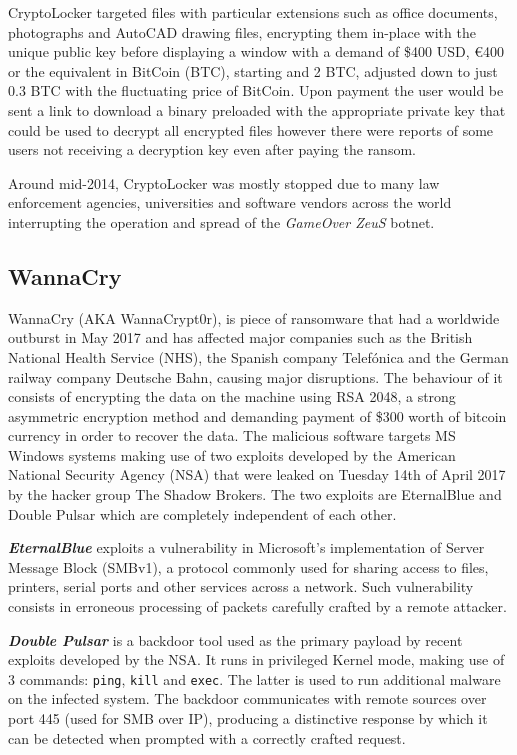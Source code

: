 \documentclass[10pt,a4paper]{article}
\begin{document}
CryptoLocker targeted files with particular extensions such as office documents, photographs and AutoCAD drawing files, encrypting them in-place with the unique public key before displaying a window with a demand of \$400 USD, \euro400 or the equivalent in BitCoin (BTC), starting and 2 BTC, adjusted down to just 0.3 BTC with the fluctuating price of BitCoin. Upon payment the user would be sent a link to download a binary preloaded with the appropriate private key that could be used to decrypt all encrypted files however there were reports of some users not receiving a decryption key even after paying the ransom.

Around mid-2014, CryptoLocker was mostly stopped due to many law enforcement agencies, universities and software vendors across the world interrupting the operation and spread of the \textit{GameOver ZeuS} botnet.

\subsection{WannaCry}
WannaCry (AKA WannaCrypt0r), is piece of ransomware that had a worldwide outburst in May 2017 and has affected major companies such as the British National Health Service (NHS), the Spanish company Telefónica and the German railway company Deutsche Bahn, causing major disruptions. The behaviour of it consists of encrypting the data on the machine using RSA 2048, a strong asymmetric encryption method and demanding payment of \$300 worth of bitcoin currency in order to recover the data. The malicious software targets MS Windows systems making use of two exploits developed by the American National Security Agency (NSA) that were leaked on Tuesday 14th of April 2017 by the hacker group The Shadow Brokers. The two exploits are EternalBlue and Double Pulsar which are completely independent of each other.

\textbf{\textit{EternalBlue}} exploits a vulnerability in Microsoft's implementation of Server Message Block (SMBv1), a protocol commonly used for sharing access to files, printers, serial ports and other services across a network. Such vulnerability consists in erroneous processing of packets carefully crafted by a remote attacker.

\textbf{\textit{Double Pulsar}} is a backdoor tool used as the primary payload by recent exploits developed by the NSA. It runs in privileged Kernel mode, making use of 3 commands: \texttt{ping}, \texttt{kill} and \texttt{exec}. The latter is used to run additional malware on the infected system. The backdoor communicates with remote sources over port 445 (used for SMB over IP), producing a distinctive response by which it can be detected when prompted with a correctly crafted request.
\end{document}
